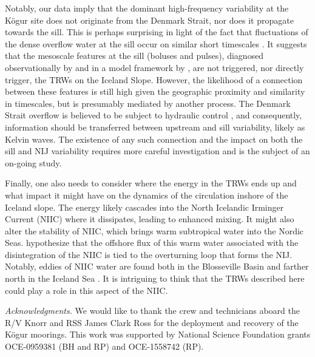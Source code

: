 \documentclass[12pt,titlepage,figuresatend]{article}
\begin{document}
Notably, our data imply that the dominant high-frequency variability at the K\"{o}gur site does not originate from the Denmark Strait, nor does it propagate towards the sill. This is perhaps surprising in light of the fact that fluctuations of the dense overflow water at the sill occur on similar short timescales \cite[]{Jochumsen2017}. It suggests that the mesoscale features at the sill (boluses and pulses), diagnosed observationally by \cite{Appen2017} and in a model framework by \cite{Almansi2017}, are not triggered, nor directly trigger, the TRWs on the Iceland Slope. However, the likelihood of a connection between these features is still high given the geographic proximity and similarity in timescales, but is presumably mediated by another process. The Denmark Strait overflow is believed to be subject to hydraulic control \cite[]{Whitehead1998,Nikolopoulos2003}, and consequently, information should be transferred between upstream and sill variability, likely as Kelvin waves. The existence of any such connection and the impact on both the sill and NIJ variability requires more careful investigation and is the subject of an on-going study. 

Finally, one also needs to consider where the energy in the TRWs ends up and what impact it might have on the dynamics of the circulation inshore of the Iceland slope. The energy likely cascades into the North Icelandic Irminger Current (NIIC) where it dissipates, leading to enhanced mixing. It might also alter the stability of NIIC, which brings warm subtropical water into the Nordic Seas. \cite[]{Vage2011} hypothesize that the offshore flux of this warm water associated with the disintegration of the NIIC is tied to the overturning loop that forms the NIJ. Notably, eddies of NIIC water are found both in the Blosseville Basin \cite[]{Jonsson2012} and farther north in the Iceland Sea \cite[]{Vage2011}. It is intriguing to think that the TRWs described here could play a role in this aspect of the NIIC. 


\bigskip
\emph{Acknowledgments.}
We would like to thank the crew and technicians aboard the R/V Knorr and RSS James Clark Ross for the deployment and recovery of the K\"{o}gur moorings. This work was supported by National Science Foundation grants OCE-0959381 (BH and RP) and OCE-1558742 (RP). 




\end{document}
